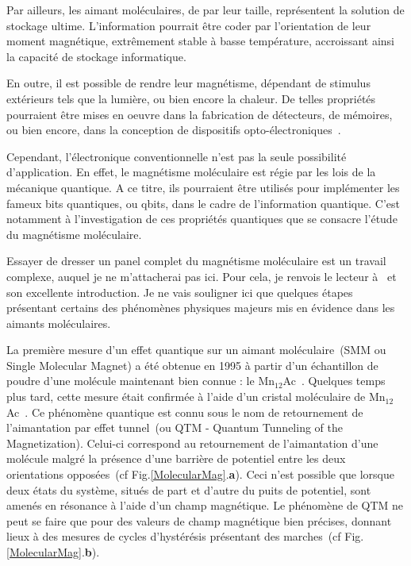 Par ailleurs, les aimant moléculaires, de par leur taille, représentent la solution de stockage ultime. L'information pourrait être coder par l'orientation de leur moment magnétique, extrêmement stable à basse température, accroissant ainsi la capacité de stockage informatique.

En outre, il est possible de rendre leur magnétisme, dépendant de stimulus extérieurs tels que la lumière, ou bien encore la chaleur. De telles propriétés pourraient \^etre mises en oeuvre dans la fabrication de détecteurs, de mémoires, ou bien encore, dans la conception de dispositifs opto-électroniques~\cite{Sanvito2011}.

Cependant, l'électronique conventionnelle n'est pas la seule possibilité d'application. En effet, le magnétisme moléculaire est régie par les lois de la mécanique quantique. A ce titre, ils pourraient \^etre utilisés pour implémenter les fameux bits quantiques, ou qbits, dans le cadre de l'information quantique. C'est notamment à l'investigation de ces propriétés quantiques que se consacre l'étude du magnétisme moléculaire.
 
Essayer de dresser un panel complet du magnétisme moléculaire est un travail complexe, auquel je ne m'attacherai pas ici. Pour cela, je renvois le lecteur à~\cite{Gatteschi2006} et son excellente introduction. Je ne vais souligner ici que quelques étapes présentant certains des phénomènes physiques majeurs mis en évidence dans les aimants moléculaires.

La première mesure d'un effet quantique sur un aimant moléculaire~(SMM ou Single Molecular Magnet) a été obtenue en 1995 à partir d'un échantillon de poudre d'une molécule maintenant bien connue : le Mn$_{12}$Ac~\cite{Friedman1996}. Quelques temps plus tard, cette mesure était confirmée à l'aide d'un cristal moléculaire de Mn$_{12}$Ac~\cite{Thomas1996}. Ce phénomène quantique est connu sous le nom de retournement de l'aimantation par effet tunnel~(ou QTM - Quantum Tunneling of the Magnetization).
Celui-ci correspond au retournement de l'aimantation d'une molécule malgré la présence d'une barrière de potentiel entre les deux orientations opposées~(cf Fig.\ref{MolecularMag}.\textbf{a}). Ceci n'est possible que lorsque deux états du système, situés de part et d'autre du puits de potentiel, sont amenés en résonance à l'aide d'un champ magnétique. Le phénomène de QTM ne peut se faire que pour des valeurs de champ magnétique bien précises, donnant lieux à des mesures de cycles d'hystérésis présentant des marches~(cf Fig.\ref{MolecularMag}.\textbf{b}).

